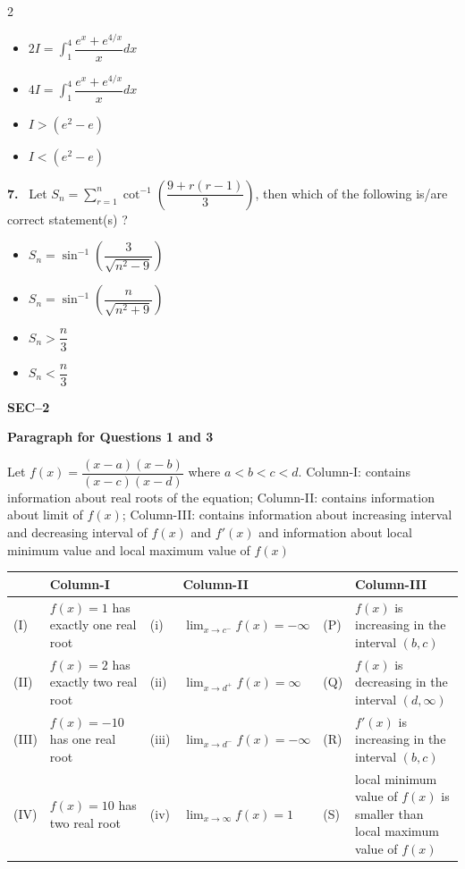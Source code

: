 \documentclass[10pt]{extarticle}
\newcommand{\sect}[1]{\par\smallskip\noindent\textbf{#1}\par}
\newcommand{\qn}[1]{\par\smallskip\noindent\textbf{#1.}~}
\newcommand{\paraq}[2]{\par\smallskip\noindent\textbf{Paragraph for Questions #1 and #2}\par}
\newenvironment{qoptions}{\begin{itemize}[leftmargin=1.8em,itemsep=1pt,topsep=2pt,label={}]}{\end{itemize}}
\newcommand{\opt}[2]{\item[(#1)] #2}
\begin{document}
\begin{multicols}{2}
\begin{qoptions}
\opt{A}{$2I=\displaystyle\int_1^4\dfrac{e^x+e^{4/x}}{x}dx$}
\opt{B}{$4I=\displaystyle\int_1^4\dfrac{e^x+e^{4/x}}{x}dx$}
\opt{C}{$I>(e^2-e)$}
\opt{D}{$I<(e^2-e)$}
\end{qoptions}
\qn{7} Let $S_n=\displaystyle\sum_{r=1}^n\cot^{-1}\left(\dfrac{9+r(r-1)}3\right)$, then which of the following is/are correct statement(s) ?
\begin{qoptions}
\opt{A}{$S_n=\sin^{-1}\left(\dfrac3{\sqrt{n^2-9}}\right)$}
\opt{B}{$S_n=\sin^{-1}\left(\dfrac n{\sqrt{n^2+9}}\right)$}
\opt{C}{$S_n>\dfrac n3$}
\opt{D}{$S_n<\dfrac n3$}
\end{qoptions}
\sect{SEC--2}
\paraq{1}{3}
Let $f(x)=\dfrac{(x-a)(x-b)}{(x-c)(x-d)}$ where $a<b<c<d$. Column-I: contains information about real roots of the equation; Column-II: contains information about limit of $f(x)$; Column-III: contains information about increasing interval and decreasing interval of $f(x)$ and $f'(x)$ and information about local minimum value and local maximum value of $f(x)$
\end{multicols}
\begin{center}\small\setlength{\tabcolsep}{4pt}
\begin{tabular}{|p{0.8cm}|p{4.4cm}|p{0.8cm}|p{3.4cm}|p{0.8cm}|p{4.2cm}|}\hline
 & \textbf{Column-I} & & \textbf{Column-II} & & \textbf{Column-III}\\\hline
(I) & $f(x)=1$ has exactly one real root & (i) & $\displaystyle\lim_{x\to c^-}f(x)=-\infty$ & (P) & $f(x)$ is increasing in the interval $(b,c)$\\\hline
(II) & $f(x)=2$ has exactly two real root & (ii) & $\displaystyle\lim_{x\to d^+}f(x)=\infty$ & (Q) & $f(x)$ is decreasing in the interval $(d,\infty)$\\\hline
(III) & $f(x)=-10$ has one real root & (iii) & $\displaystyle\lim_{x\to d^-}f(x)=-\infty$ & (R) & $f'(x)$ is increasing in the interval $(b,c)$\\\hline
(IV) & $f(x)=10$ has two real root & (iv) & $\displaystyle\lim_{x\to\infty}f(x)=1$ & (S) & local minimum value of $f(x)$ is smaller than local maximum value of $f(x)$\\\hline
\end{tabular}
\end{center}
\end{document}

